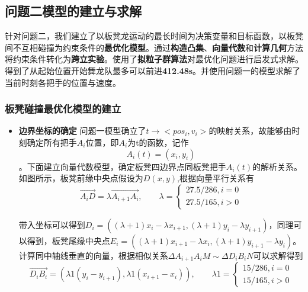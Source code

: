 \documentclass[a4paper]{article}
\begin{document}
	\subsection{问题二模型的建立与求解}
	     针对问题二，我们建立了以板凳龙运动的最长时间为决策变量和目标函数，以板凳间不互相碰撞为约束条件的\textbf{最优化模型}。通过\textbf{构造凸集}、\textbf{向量代数}和\textbf{计算几何}方法将约束条件转化为\textbf{跨立实验}。使用了\textbf{拟粒子群算法}对最优化问题进行启发式求解。得到了从起始位置开始舞龙队最多可以前进\textbf{412.48s}。并使用问题一的模型求解了当前时刻各把手的位置与速度。

        \subsubsection{板凳碰撞最优化模型的建立}
    \begin{itemize}
        \item {\textbf{边界坐标的确定}}
        问题一模型确立了$t\to<pos_i,v_i>$的映射关系，故能够由时刻确定所有把手$A_{i}$位置，即$A_{i}$为t的函数，记作$$A_{i}(t) = (x_i, y_i)$$。下面建立向量代数模型，确定板凳四边界点同板凳把手$A_i(t)$的解析关系。如图所示，板凳前缘中央点假设为$D(x,y)$,根据向量平行关系有
        $$
                   \overrightarrow{A_iD} = \lambda\overrightarrow{A_{i+1}A_i}
        ,\quad\quad \lambda = \left\{ \begin{array}{c}
              27.5 / 286, i = 0 \\
              27.5 / 165, i > 0

        \end{array}\right.
        $$

        带入坐标可以得到$D_i = ((\lambda + 1) x_{i} - \lambda x_{i + 1}, (\lambda + 1) y_{i} - \lambda y_{i + 1})$，同理可以得到，板凳尾缘中央点$E_i = ((\lambda + 1) x_{i + 1} - \lambda x_{i}, (\lambda + 1) y_{i + 1} - \lambda y_{i})$。
        计算同中轴线垂直的向量，根据相似关系$\Delta A_{i+ 1}A_iM \sim \Delta D_iB_iN$可以求解得到
        $$\overrightarrow{D_i B_i} = (\lambda 1 (y_i - y_{i + 1}), \lambda 1 (x_{i + 1} - x_i)),
        \quad \quad \lambda 1 = \left\{ \begin{array}{c}
             15/286, i = 0  \\
             15/165, i > 0
        \end{array}
        \right.$$


\end{itemize}
\end{document}
